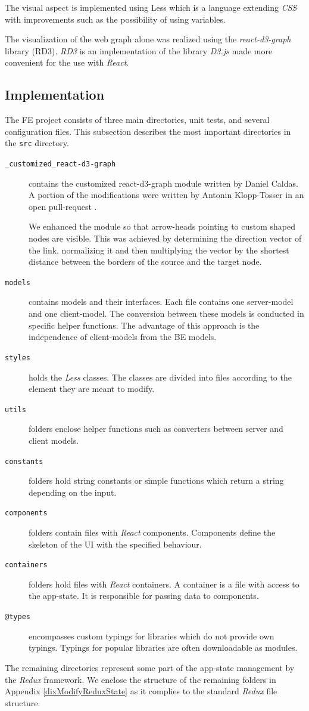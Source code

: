 The visual aspect is implemented using Less \cite{less} which is a language extending \textit{CSS} with improvements such as the possibility of using variables.

The visualization of the web graph alone was realized using the \textit{react-d3-graph} library \cite{reactD3Graph} (RD3). \textit{RD3} is 
an implementation of the library \textit{D3.js} \cite{d3} made more convenient for the use with \textit{React}. 

\subsection{Implementation} \label{FEImplementation}
The FE project consists of three main directories, unit tests, and several configuration files. This subsection describes the most important directories in the \texttt{src} directory. 
\begin{description}
    \item[\texttt{\_customized\_react-d3-graph}] contains the customized react-d3-graph module \cite{reactD3Graph} written by Daniel Caldas. A portion of the modifications were written by Antonin Klopp-Tosser in an open pull-request \cite{reactD3GraphPR}. 

We enhanced the module so that arrow-heads pointing to custom shaped nodes are visible. This was achieved by determining the direction vector of the link, normalizing it and then multiplying the vector by the shortest distance between the borders of the source and the target node.
    \item[\texttt{models}] contains models and their interfaces. Each file contains one server-model and one client-model. The conversion between these models is conducted in specific helper functions. The advantage of this approach is the independence of client-models from the BE models.
    \item[\texttt{styles}] holds the \textit{Less} classes. The classes are divided into files according to the element they are meant to modify.
    \item[\texttt{utils}] folders enclose helper functions such as converters between server and client models.
    \item[\texttt{constants}] folders hold string constants or simple functions which return a string depending on the input. 
    \item[\texttt{components}] folders contain files with \textit{React} components. Components define the skeleton of the UI with the specified behaviour.
    \item[\texttt{containers}] folders hold files with \textit{React} containers. A container is a file with access to the app-state. It is responsible for passing data to components. 
    \item[\texttt{@types}] encompasses custom typings for libraries which do not provide own typings. Typings for popular libraries are often downloadable as modules.
\end{description}
The remaining directories represent some part of the app-state management by the \textit{Redux} framework. We enclose the structure of the remaining folders in Appendix \ref{dixModifyReduxState} as it complies to the standard \textit{Redux} file structure.
